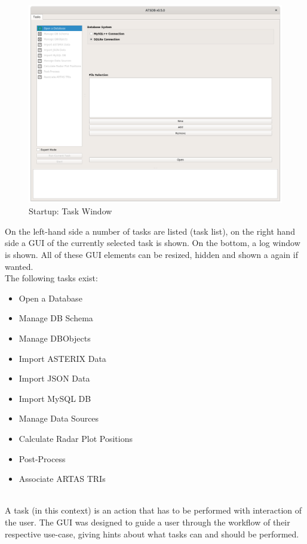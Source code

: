 \begin{figure}[H]
  \hspace*{-2.5cm}
    \includegraphics[width=19cm]{../screenshots/task_open_database.png}
  \caption{Startup: Task Window}
\end{figure}

On the left-hand side a number of tasks are listed (task list), on the right hand side a GUI of the currently selected task is shown. On the bottom, a log window is shown. All of these GUI elements can be resized, hidden and shown a again if wanted. \\


The following tasks exist:
\begin{itemize}
 \item Open a Database
 \item Manage DB Schema
 \item Manage DBObjects
 \item Import ASTERIX Data
 \item Import JSON Data
 \item Import MySQL DB
 \item Manage Data Sources
 \item Calculate Radar Plot Positions
 \item Post-Process
 \item Associate ARTAS TRIs
\end{itemize}
\  \\

A task (in this context) is an action that has to be performed with interaction of the user. The GUI was designed to guide a user through the workflow of their respective use-case, giving hints about what tasks can and should be performed. \\

